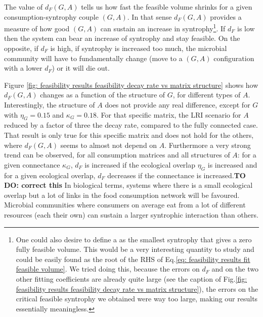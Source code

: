 \documentclass[12pt, titlepage]{report}
\begin{document}
  The value of $d_F(G,A)$ tells us how fast the feasible volume shrinks for a given consumption-syntrophy couple $(G,A)$. In that sense $d_F(G,A)$ provides a measure of how good $(G,A)$ can sustain an increase in syntrophy\footnote{One could also desire to define a  as the smallest syntrophy that gives a zero fully feasible volume. This would be a very interesting quantity to study and could be easily found as the root of the RHS of Eq.\eqref{eq: feasibility results fit feasible volume}. We tried doing this, because the errors on $d_F$ and on the two other fitting coefficients are already quite large (see the caption of Fig.\ref{fig: feasibility results feasibility decay rate vs matrix structure}), the errors on the critical feasible syntrophy we obtained were way too large, making our results essentially meaningless.}. If $d_F$ is low then the system can bear an increase of syntrophy and stay feasible. On the opposite, if $d_F$ is high, if syntrophy is increased too much, the microbial community will have to fundamentally change (\eg move to a $(G,A)$ configuration with a lower $d_F$) or it will die out.

  Figure \ref{fig: feasibility results feasibility decay rate vs matrix structure} shows how $d_F(G,A)$ changes as a function of the structure of $G$, for different types of $A$. Interestingly, the structure of $A$ does not provide any real difference, except for $G$ with $\eta_G=0.15$ and $\kappa_G=0.18$. For that specific matrix, the LRI scenario for $A$ reduced by a factor of three the decay rate, compared to the fully connected case. That result is only true for this specific matrix and does not hold for the others, where $d_F(G,A)$ seems to almost not depend on $A$. Furthermore a very strong trend can be observed, for all consumption matrices and all structures of $A$: for a given connectance $\kappa_G$, $d_F$ is increased if the ecological overlap $\eta_G$ is increased and for a given ecological overlap, $d_F$ decreases if the connectance is increased.\textbf{TO DO: correct this}
  In biological terms, systems where there is a small ecological overlap but a lot of links in the food consumption network will be favoured. Microbial communities where consumers on average eat from a lot of different resources (\ie each their own) can sustain a larger syntrophic interaction than others.

\end{document}
